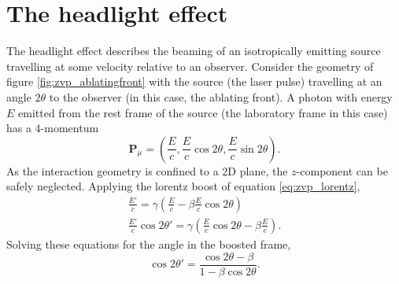 \section{The headlight effect}\label{sec:app_headlight}
The headlight effect describes the beaming of an isotropically emitting source travelling at some velocity relative to an observer. Consider the geometry of figure \ref{fig:zvp_ablatingfront} with the source (the laser pulse) travelling at an angle $2\theta$ to the observer (in this case, the ablating front). A photon with energy $E$ emitted from the rest frame of the source (the laboratory frame in this case) has a 4-momentum
\begin{equation}
	\mathbf{P}_\mu = \left(\frac{E}{c},\frac{E}{c}\cos{2\theta},\frac{E}{c}\sin{2\theta}\right).
\end{equation}
As the interaction geometry is confined to a 2D plane,  the $z$-component can be safely neglected. Applying the lorentz boost of equation \ref{eq:zvp_lorentz},
\begin{equation}
	\begin{split}
		\frac{E'}{c} = \gamma \left( \frac{E}{c} - \beta \frac{E}{c}\cos{2\theta}\right) \\
		\frac{E'}{c}\cos{2\theta'} = \gamma \left( \frac{E}{c}\cos{2\theta} - \beta \frac{E}{c}\right).
	\end{split}
\end{equation}
Solving these equations for the angle in the boosted frame,
\begin{equation}
	\cos{2\theta'} = \frac{\cos{2\theta} - \beta}{1-\beta\cos{2\theta}}.
\end{equation}

